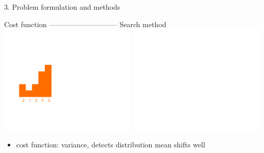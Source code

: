 \documentclass[first=orange,second=blue,logo=blueque]{aaltoslides}
\begin{document}

\begin{frame}{3. Problem formulation and methods}
    \begin{block}{ {\color{black}Cost function} {\color{white}-----------------------------} {\color{white}Search method}}
        \includegraphics[width=0.49\textwidth]{figures/costfunction.pdf}
        \includegraphics[width=0.49\textwidth]{figures/searchmethod_invisible.pdf}\\
        \vspace{-1cm} \hspace{0.5cm}
        \color{orange}{$\sigma^2=2.7$}
        \begin{itemize}
            \item \alert{cost function}: variance, detects distribution mean shifts well
        \end{itemize}
    \end{block}
\end{frame}

\end{document}
